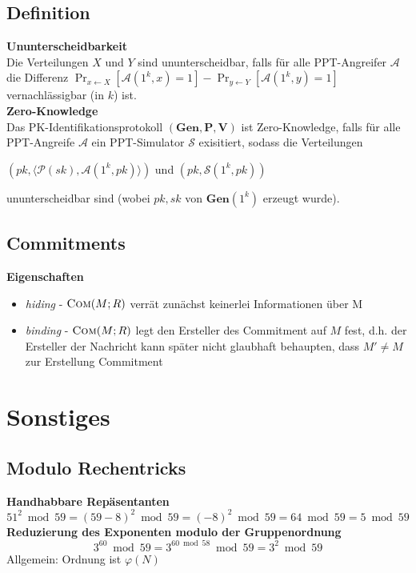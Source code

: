 \documentclass[10pt,a4paper]{article}
\begin{document}
        \subsection{Definition}
        \textbf{Ununterscheidbarkeit}\\
        Die Verteilungen \(X\) und \(Y\) sind ununterscheidbar, falls für alle PPT-Angreifer
        \(\mathcal{A}\) die Differenz
        \(\Pr_{x \leftarrow X}[\mathcal{A}(1^k, x) = 1] - \Pr_{y \leftarrow Y}[\mathcal{A}(1^k, y) = 1]\)
        vernachlässigbar (in \(k\)) ist.\\
        \textbf{Zero-Knowledge}\\
        Das PK-Identifikationsprotokoll \((\mathbf{Gen}, \mathbf{P}, \mathbf{V})\) ist Zero-Knowledge, falls für alle
        PPT-Angreife \(\mathcal{A}\) ein PPT-Simulator \(\mathcal{S}\) exisitiert, sodass die Verteilungen\\
        \begin{center}
          \((\mathit{pk}, \langle\mathcal{P}(\mathit{sk}),\mathcal{A}(1^k, \mathit{pk})\rangle)\)
          und
          \((\mathit{pk}, \mathcal{S}(1^k, \mathit{pk}))\)
        \end{center}
        ununterscheidbar sind (wobei \(\mathit{pk}, \mathit{sk}\) von \(\mathbf{Gen}(1^k)\) erzeugt wurde).
        \subsection{Commitments}
        \textbf{Eigenschaften}
        \begin{itemize}
        \item \textit{hiding} - \(\textsc{Com}(M; R)\) verrät zunächst keinerlei Informationen über M
        \item \textit{binding} - \(\textsc{Com}(M; R)\) legt den Ersteller des Commitment auf \(M\) fest, d.h.
          der Ersteller der Nachricht kann später nicht glaubhaft behaupten, dass \(M' \neq M\) zur Erstellung
          Commitment
        \end{itemize}
        
        \section{Sonstiges}
        \subsection{Modulo Rechentricks}
        \textbf{Handhabbare Repäsentanten}
        \[51^2 \bmod 59 = (59-8)^2 \bmod 59 = (-8)^2 \bmod 59 = 64 \bmod 59 = 5 \bmod 59\]
        \textbf{Reduzierung des Exponenten modulo der Gruppenordnung}
        \[3^{60} \bmod 59 = 3^{60 \bmod 58} \bmod 59 = 3^2 \bmod 59\]
        Allgemein: Ordnung ist \(\varphi(N)\)
\end{document}
